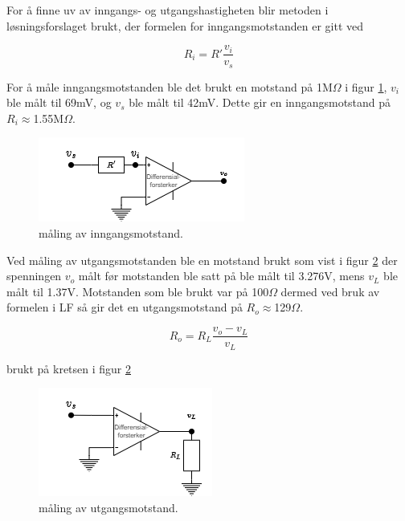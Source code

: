 For å finne uv av inngangs- og utgangshastigheten blir metoden i løsningsforslaget \cite{ntnu_2022_ttt4265} brukt, der formelen for inngangsmotstanden er gitt ved

\begin{equation}
    R_i=R'\frac{v_i}{v_s}
\end{equation}

For å måle inngangsmotstanden ble det brukt en motstand på 1M$\Omega$ i figur \ref{fig:lastmot}, $v_i$ ble målt til 69mV, og $v_s$ ble målt til 42mV. Dette gir en inngangsmotstand på $R_i\approx$1.55M$\Omega$.

\begin{figure}[!hbt]
	\centering
	\includegraphics[scale=0.7]{./Images/03Research/lastmot.png}
	\caption{måling av inngangsmotstand.}
	\label{fig:lastmot}
\end{figure}

Ved måling av utgangsmotstanden ble en motstand brukt som vist i figur \ref{fig:outmot} der spenningen $v_o$ målt før motstanden ble satt på ble målt til 3.276V, mens $v_L$ ble målt til 1.37V. Motstanden som ble brukt var på 100$\Omega$ dermed ved bruk av formelen i LF \cite{ntnu_2022_ttt4265} så gir det en utgangsmotstand på $R_o\approx$129$\Omega$.

\begin{equation}
    R_o=R_L\frac{v_o-v_L}{v_L}
\end{equation}

brukt på kretsen i figur \ref{fig:outmot} 

\begin{figure}[!hbt]
	\centering
	\includegraphics[scale=0.7]{./Images/03Research/outmot.png}
	\caption{måling av utgangsmotstand.}
	\label{fig:outmot}
\end{figure}